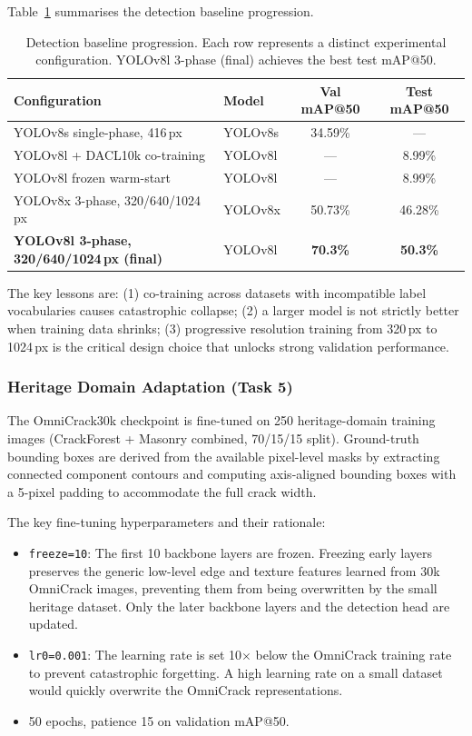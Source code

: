 \documentclass[12pt,a4paper]{article}
\begin{document}
Table~\ref{tab:det_ablation} summarises the detection baseline progression.

\begin{table}[H]
\centering
\caption{Detection baseline progression. Each row represents a distinct experimental configuration. YOLOv8l 3-phase (final) achieves the best test mAP@50.}
\label{tab:det_ablation}
\begin{tabular}{p{5.0cm}lcc}
\toprule
\rowcolor{white}
\textbf{Configuration} & \textbf{Model} & \textbf{Val mAP@50} & \textbf{Test mAP@50} \\
\midrule
YOLOv8s single-phase, 416\,px & YOLOv8s & 34.59\% & --- \\
YOLOv8l + DACL10k co-training & YOLOv8l & --- & 8.99\% \\
YOLOv8l frozen warm-start & YOLOv8l & --- & 8.99\% \\
YOLOv8x 3-phase, 320/640/1024\,px & YOLOv8x & 50.73\% & 46.28\% \\
\textbf{YOLOv8l 3-phase, 320/640/1024\,px (final)} & YOLOv8l & \textbf{70.3\%} & \textbf{50.3\%} \\
\bottomrule
\end{tabular}
\end{table}

The key lessons are: (1) co-training across datasets with incompatible label vocabularies causes catastrophic collapse; (2) a larger model is not strictly better when training data shrinks; (3) progressive resolution training from 320\,px to 1024\,px is the critical design choice that unlocks strong validation performance.

\subsubsection{Heritage Domain Adaptation (Task 5)}

The OmniCrack30k checkpoint is fine-tuned on 250 heritage-domain training images (CrackForest + Masonry combined, 70/15/15 split). Ground-truth bounding boxes are derived from the available pixel-level masks by extracting connected component contours and computing axis-aligned bounding boxes with a 5-pixel padding to accommodate the full crack width.

The key fine-tuning hyperparameters and their rationale:

\begin{itemize}[leftmargin=1.5cm]
\item \texttt{freeze=10}: The first 10 backbone layers are frozen. Freezing early layers preserves the generic low-level edge and texture features learned from 30k OmniCrack images, preventing them from being overwritten by the small heritage dataset. Only the later backbone layers and the detection head are updated.
\item \texttt{lr0=0.001}: The learning rate is set 10$\times$ below the OmniCrack training rate to prevent catastrophic forgetting. A high learning rate on a small dataset would quickly overwrite the OmniCrack representations.
\item 50 epochs, patience 15 on validation mAP@50.
\end{itemize}
\end{document}
